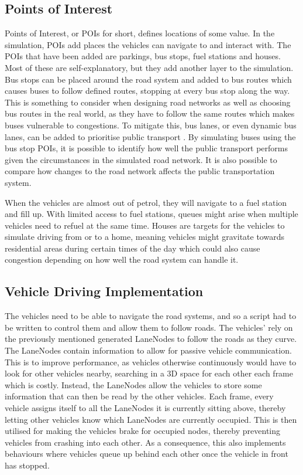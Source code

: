     \subsection{Points of Interest} \label{poi}
        Points of Interest, or POIs for short, defines locations of some value. In the simulation, POIs add places the vehicles can navigate to and interact with. The POIs that have been added are parkings, bus stops, fuel stations and houses. Most of these are self-explanatory, but they add another layer to the simulation. Bus stops can be placed around the road system and added to bus routes which causes buses to follow defined routes, stopping at every bus stop along the way. This is something to consider when designing road networks as well as choosing bus routes in the real world, as they have to follow the same routes which makes buses vulnerable to congestions. To mitigate this, bus lanes, or even dynamic bus lanes, can be added to prioritise public transport \cite{bus-lanes}. By simulating buses using the bus stop POIs, it is possible to identify how well the public transport performs given the circumstances in the simulated road network. It is also possible to compare how changes to the road network affects the public transportation system.

        When the vehicles are almost out of petrol, they will navigate to a fuel station and fill up. With limited access to fuel stations, queues might arise when multiple vehicles need to refuel at the same time. Houses are targets for the vehicles to simulate driving from or to a home, meaning vehicles might gravitate towards residential areas during certain times of the day which could also cause congestion depending on how well the road system can handle it.

    \subsection{Vehicle Driving Implementation}
        The vehicles need to be able to navigate the road systems, and so a script had to be written to control them and allow them to follow roads. The vehicles' rely on the previously mentioned generated LaneNodes to follow the roads as they curve. The LaneNodes contain information to allow for passive vehicle communication. This is to improve performance, as vehicles otherwise continuously would have to look for other vehicles nearby, searching in a 3D space for each other each frame which is costly. Instead, the LaneNodes allow the vehicles to store some information that can then be read by the other vehicles. Each frame, every vehicle assigns itself to all the LaneNodes it is currently sitting above, thereby letting other vehicles know which LaneNodes are currently occupied. This is then utilised for making the vehicles brake for occupied nodes, thereby preventing vehicles from crashing into each other. As a consequence, this also implements behaviours where vehicles queue up behind each other once the vehicle in front has stopped.
    
